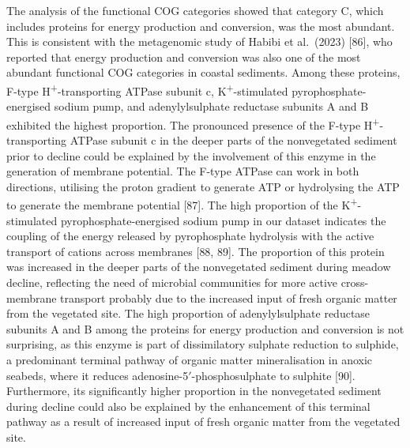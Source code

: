 \documentclass[
  12 pt,
]{article}
\begin{document}
The analysis of the functional COG categories showed that category C, which includes proteins for energy production and conversion, was the most abundant. This is consistent with the metagenomic study of Habibi et al.~(2023) {[}86{]}, who reported that energy production and conversion was also one of the most abundant functional COG categories in coastal sediments. Among these proteins, F-type H\textsuperscript{+}-transporting ATPase subunit c, K\textsuperscript{+}-stimulated pyrophosphate-energised sodium pump, and adenylylsulphate reductase subunits A and B exhibited the highest proportion. The pronounced presence of the F-type H\textsuperscript{+}-transporting ATPase subunit c in the deeper parts of the nonvegetated sediment prior to decline could be explained by the involvement of this enzyme in the generation of membrane potential. The F-type ATPase can work in both directions, utilising the proton gradient to generate ATP or hydrolysing the ATP to generate the membrane potential {[}87{]}. The high proportion of the K\textsuperscript{+}-stimulated pyrophosphate-energised sodium pump in our dataset indicates the coupling of the energy released by pyrophosphate hydrolysis with the active transport of cations across membranes {[}88, 89{]}. The proportion of this protein was increased in the deeper parts of the nonvegetated sediment during meadow decline, reflecting the need of microbial communities for more active cross-membrane transport probably due to the increased input of fresh organic matter from the vegetated site. The high proportion of adenylylsulphate reductase subunits A and B among the proteins for energy production and conversion is not surprising, as this enzyme is part of dissimilatory sulphate reduction to sulphide, a predominant terminal pathway of organic matter mineralisation in anoxic seabeds, where it reduces adenosine-5\('\)-phosphosulphate to sulphite {[}90{]}. Furthermore, its significantly higher proportion in the nonvegetated sediment during decline could also be explained by the enhancement of this terminal pathway as a result of increased input of fresh organic matter from the vegetated site.
\end{document}
